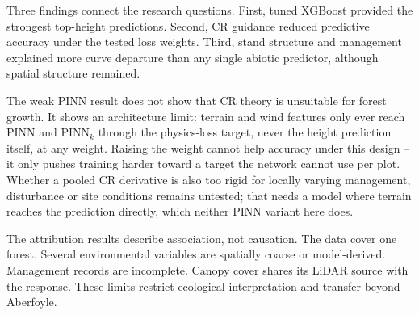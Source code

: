 Three findings connect the research questions. First, tuned XGBoost provided the strongest
top-height predictions. Second, CR guidance reduced predictive accuracy under the tested loss
weights. Third, stand structure and management explained more curve departure than any single
abiotic predictor, although spatial structure remained.

The weak PINN result does not show that CR theory is unsuitable for forest growth. It shows an
architecture limit: terrain and wind features only ever reach PINN and PINN$_k$ through the
physics-loss target, never the height prediction itself, at any weight. Raising the weight cannot
help accuracy under this design -- it only pushes training harder toward a target the network
cannot use per plot. Whether a pooled CR derivative is also too rigid for locally varying
management, disturbance or site conditions remains untested; that needs a model where terrain
reaches the prediction directly, which neither PINN variant here does.

The attribution results describe association, not causation. The data cover one forest. Several
environmental variables are spatially coarse or model-derived. Management records are incomplete.
Canopy cover shares its LiDAR source with the response. These limits restrict ecological
interpretation and transfer beyond Aberfoyle.


